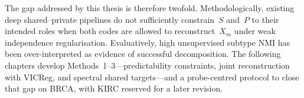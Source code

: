 The gap addressed by this thesis is therefore twofold. Methodologically, existing deep shared--private pipelines do not sufficiently constrain~$S$ and~$P$ to their intended roles when both codes are allowed to reconstruct~$X_m$ under weak independence regularisation. Evaluatively, high unsupervised subtype NMI has been over-interpreted as evidence of successful decomposition. The following chapters develop Methods~1--3---predictability constraints, joint reconstruction with VICReg, and spectral shared targets---and a probe-centred protocol to close that gap on BRCA, with KIRC reserved for a later revision.
